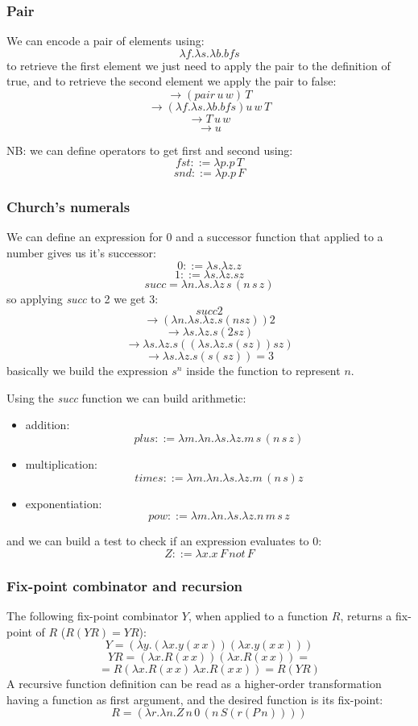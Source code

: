 \subsubsection{Pair}
We can encode a pair of elements using:
$$
    \lambda f. \lambda s. \lambda b. b f s
$$
to retrieve the first element we just need to apply the pair to the definition of true, and to retrieve the second element we apply the pair to false:
$$
    \xrightarrow{} (pair\,u\,w)\,T
$$
$$
    \xrightarrow{} (\lambda f. \lambda s. \lambda b. b f s) u\, w\, T 
$$
$$
    \xrightarrow{} T\, u\, w 
$$
$$
    \xrightarrow{} u
$$

NB: we can define operators to get first and second using:
$$
    fst ::= \lambda p. p\, T
$$
$$
    snd ::= \lambda p. p\, F
$$

\subsubsection{Church's numerals}
We can define an expression for 0 and a successor function that applied to a number gives us it's successor:
$$
    0 ::= \lambda s. \lambda z.z
$$
$$
    1 ::= \lambda s. \lambda z. s z
$$
$$
    succ = \lambda n. \lambda s. \lambda z\, s\, (n\, s\, z)
$$
so applying \emph{succ} to 2 we get 3:
$$
    succ 2
$$
$$
    \xrightarrow{} (\lambda n. \lambda s. \lambda z. s (n s z)) 2
$$
$$
    \xrightarrow{} \lambda s. \lambda z. s (2 s z)
$$
$$
    \xrightarrow{} \lambda s. \lambda z. s ((\lambda s. \lambda z. s (s z)) s z)
$$
$$
    \xrightarrow{} \lambda s. \lambda z. s ( s (s z)) = 3
$$
basically we build the expression $s^n$ inside the function to represent $n$.

Using the \emph{succ} function we can build arithmetic:
\begin{itemize}
    \item addition:
$$
    plus ::= \lambda m. \lambda n. \lambda s. \lambda z. m\, s\, (n\, s\, z)
$$
    \item multiplication:
$$
    times ::= \lambda m. \lambda n. \lambda s. \lambda z. m\, (n\, s) z
$$
    \item exponentiation:
$$
    pow ::= \lambda m. \lambda n. \lambda s. \lambda z. n\, m\, s\, z
$$
\end{itemize}
and we can build a test to check if an expression evaluates to 0:
$$
    Z ::= \lambda x. x \, F \, not \, F
$$

\subsubsection{Fix-point combinator and recursion}
The following fix-point combinator $Y$, when applied to a function $R$, returns a fix-point of $R$ ($R(YR) = YR$):
$$
    Y = (\lambda y.( \lambda x.y(x\, x) )( \lambda x.y(x\, x) ))
$$
$$
    YR = ( \lambda x.R(x\, x) )( \lambda x.R(x\, x) ) =
$$
$$
    = R(\lambda x.R(x\, x) \, \lambda x.R(x\, x)) = R(YR)
$$
A recursive function definition can be read as a higher-order transformation having a function as first argument, and the desired function is its fix-point:
$$
    R = (\lambda r. \lambda n. Z \, n \, 0 \, (n \, S (r (P \, n))))
$$

